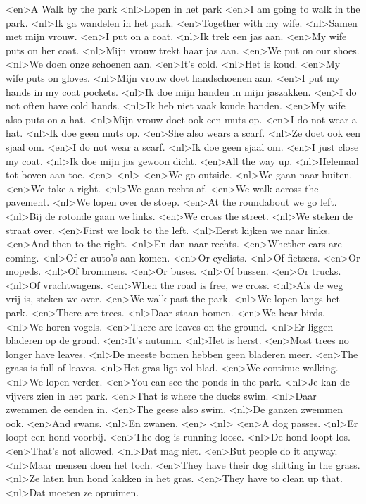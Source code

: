 <en>A Walk by the park
<nl>Lopen in het park
<en>I am going to walk in  the park.
<nl>Ik ga wandelen in het park.
<en>Together with my wife.
<nl>Samen met mijn vrouw.
<en>I put on a coat.
<nl>Ik trek een jas aan.
<en>My wife puts on her coat.
<nl>Mijn vrouw trekt haar jas aan.
<en>We put on our shoes.
<nl>We doen onze schoenen aan.
<en>It's cold.
<nl>Het is koud.
<en>My wife puts on gloves.
<nl>Mijn vrouw doet handschoenen aan.
<en>I put my hands in my coat pockets.
<nl>Ik doe mijn handen in mijn jaszakken.
<en>I do not often have cold hands.
<nl>Ik heb niet vaak koude handen.
<en>My wife also puts on a hat.
<nl>Mijn vrouw doet ook een muts op.
<en>I do not wear a hat.
<nl>Ik doe geen muts op.
<en>She also wears a scarf.
<nl>Ze doet ook een sjaal om.
<en>I do not wear a scarf.
<nl>Ik doe geen sjaal om.
<en>I just close my coat.
<nl>Ik doe mijn jas gewoon dicht.
<en>All the way up.
<nl>Helemaal tot boven aan toe.
<en>
<nl>
<en>We go outside.
<nl>We gaan naar buiten.
<en>We take a right.
<nl>We gaan rechts af.
<en>We walk across the pavement.
<nl>We lopen over de stoep.
<en>At the roundabout we go left.
<nl>Bij de rotonde gaan we links.
<en>We cross the street.
<nl>We steken de straat over.
<en>First we look to the left.
<nl>Eerst kijken we naar links.
<en>And then to the right.
<nl>En dan naar rechts.
<en>Whether cars are coming.
<nl>Of er auto's aan komen.
<en>Or cyclists.
<nl>Of fietsers.
<en>Or mopeds.
<nl>Of brommers.
<en>Or buses.
<nl>Of bussen.
<en>Or trucks.
<nl>Of vrachtwagens.
<en>When the road is free, we cross.
<nl>Als de weg vrij is, steken we over.
<en>We walk past the park.
<nl>We lopen langs het park.
<en>There are trees.
<nl>Daar staan bomen.
<en>We hear birds.
<nl>We horen vogels.
<en>There are leaves on the ground.
<nl>Er liggen bladeren op de grond.
<en>It's autumn.
<nl>Het is herst.
<en>Most trees no longer have leaves.
<nl>De meeste bomen hebben geen bladeren meer.
<en>The grass is full of leaves.
<nl>Het gras ligt vol blad.
<en>We continue walking.
<nl>We lopen verder.
<en>You can see the ponds in the park.
<nl>Je kan de vijvers zien in het park.
<en>That is where the ducks swim.
<nl>Daar zwemmen de eenden in.
<en>The geese also swim.
<nl>De ganzen zwemmen ook.
<en>And swans.
<nl>En zwanen.
<en>
<nl>
<en>A dog passes.
<nl>Er loopt een hond voorbij.
<en>The dog is running loose.
<nl>De hond loopt los.
<en>That's not allowed.
<nl>Dat mag niet.
<en>But people do it anyway.
<nl>Maar mensen doen het toch.
<en>They have their dog shitting in the grass.
<nl>Ze laten hun hond kakken in het gras.
<en>They have to clean up that.
<nl>Dat moeten ze opruimen.

